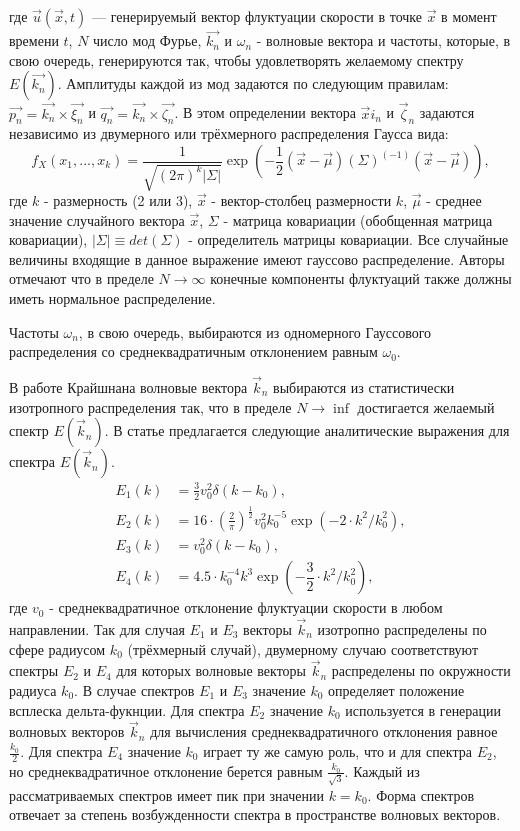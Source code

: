 \noindent
где $\vec{u} (\vec{x}, t)$ — генерируемый вектор флуктуации скорости в точке $\vec{x}$ в момент времени $t$, $N$ число мод Фурье, $\vec{k_n}$ и $\omega_n$ - волновые вектора и частоты, которые, в свою очередь, генерируются так, чтобы удовлетворять желаемому спектру $E(\vec{k_n})$. Амплитуды каждой из мод задаются по следующим правилам: $\vec{p_n} = \vec{k_n} \times \vec{\xi_n}$ и $\vec{q_n} = \vec{k_n} \times \vec{\zeta_n}$. В этом определении вектора $\vec xi_n$ и $\vec \zeta_n$ задаются независимо из двумерного или трёхмерного распределения Гаусса вида:  
\begin{equation}
  \label{eq:gauss_distr1}
  f_X (x_1, ..., x_k) = \frac{1}{\sqrt{(2 \pi)^k \left|\Sigma\right|}} \exp{(- \frac{1}{2} (\vec{x} - \vec{\mu}) (\Sigma)^(-1) (\vec{x} - \vec{\mu}) )},
\end{equation}
\noindent
где $k$ - размерность (2 или 3), $\vec x$ - вектор-столбец размерности $k$, $\vec \mu$ - среднее значение случайного вектора $\vec x$, $\Sigma$ - матрица ковариации (обобщенная матрица ковариации), $\left| \Sigma \right| \equiv det(\Sigma)$ - определитель матрицы ковариации. Все случайные величины входящие в данное выражение имеют гауссово распределение. Авторы отмечают что в пределе $N \rightarrow \infty$ конечные компоненты флуктуаций также должны иметь нормальное распределение.

Частоты $\omega_n$, в свою очередь, выбираются из одномерного Гауссового распределения со среднеквадратичным отклонением равным $\omega_0$. 

В работе Крайшнана волновые вектора $\vec k_n$ выбираются из статистически изотропного распределения так, что в пределе $N \rightarrow \inf$ достигается желаемый спектр $E(\vec k_n)$. В статье предлагается следующие аналитические выражения для спектра $E(\vec k_n)$.
\begin{align}
  \label{eq:spectral_equation2}
  E_1(k) & = \frac{3}{2} v_0^2 \delta(k-k_0), \nonumber \\
  E_2(k) & = 16 \cdot (\frac{2}{\pi})^{\frac{1}{2}} v_0^2 k_0^{-5} \exp{(- 2 \cdot k^2 / k_0^2)}, \nonumber \\
  E_3(k) & = v_0^2 \delta(k-k_0), \nonumber \\
  E_4(k) & = 4.5 \cdot k_0^{-4} k^3 \exp{(- \dfrac{3}{2} \cdot k^2 / k_0^2)},
\end{align}
\noindent
где $v_0$ - среднеквадратичное отклонение флуктуации скорости в любом направлении. Так для случая $E_1$ и $E_3$ векторы $\vec k_n$ изотропно распределены по сфере радиусом $k_0$ (трёхмерный случай), двумерному случаю соответствуют спектры $E_2$ и $E_4$ для которых волновые векторы $\vec k_n$ распределены по окружности радиуса $k_0$. В случае спектров $E_1$ и $E_3$ значение $k_0$ определяет положение всплеска дельта-фукнции. Для спектра $E_2$ значение $k_0$ используется в генерации волновых векторов $\vec k_n$ для вычисления среднеквадратичного отклонения равное $\frac{k_0}{2}$. Для спектра $E_4$ значение $k_0$ играет ту же самую роль, что и для спектра $E_2$, но среднеквадратичное отклонение берется равным $\frac{k_0}{\sqrt{3}}$. Каждый из рассматриваемых спектров имеет пик при значении $k = k_0$. Форма спектров отвечает за степень возбужденности спектра в пространстве волновых векторов.

